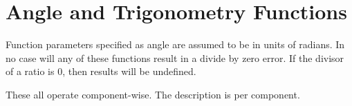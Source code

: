 \hypertarget{group__core__func__trigonometric}{\section{\-Angle and \-Trigonometry \-Functions}
\label{group__core__func__trigonometric}
}
\-Function parameters specified as angle are assumed to be in units of radians. \-In no case will any of these functions result in a divide by zero error. \-If the divisor of a ratio is 0, then results will be undefined.

\-These all operate component-\/wise. \-The description is per component. 